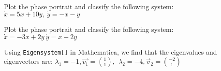 \documentclass[11pt,answers]{exam}
\begin{document}
\begin{questions}

\addtocounter{question}{42}
\item Plot the phase portrait and classify the following system: $\dot{x} = 5x + 10y, \: \dot{y} = -x - y$
\begin{solution}
\end{solution}


\item Plot the phase portrait and classify the following system: $\dot{x} = -3x + 2y \: \dot{y} = x - 2y$
\begin{solution}
Using \texttt{Eigensystem[]} in Mathematica, we find that the eigenvalues and eigenvectors are: $\displaystyle \lambda_1 = -1, \vec{v_1} = \binom{1}{1}, \:\: \lambda_2 = -4, \vec{v}_2 = \binom{-2}{1}$
\begin{center}
\end{center}
\end{solution}



\end{questions}
\end{document}
